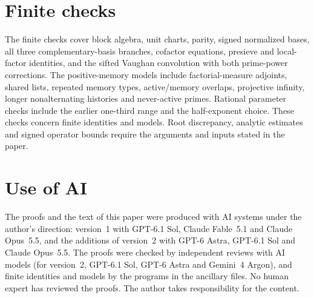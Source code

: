 \documentclass[11pt]{article}
\theoremstyle{definition}
\theoremstyle{remark}
\numberwithin{equation}{section}
\begin{document}
\normalsize

\section{Finite checks}\label{app:checks}
The finite checks cover block algebra, unit charts, parity, signed
normalized bases, all three complementary-basis branches, cofactor
equations, presieve and local-factor identities, and the sifted
Vaughan convolution with both prime-power corrections.
The positive-memory models include factorial-measure adjoints,
shared lists, repeated memory types, active/memory overlaps,
projective infinity, longer nonalternating histories and never-active
primes. Rational parameter checks include the earlier one-third
range and the half-exponent choice.
These checks concern finite identities and models. Root discrepancy,
analytic estimates and signed operator bounds require the arguments
and inputs stated in the paper.



\section*{Use of AI}
The proofs and the text of this paper were produced with AI systems
under the author's direction: version~1 with GPT-6.1 Sol, Claude
Fable~5.1 and Claude Opus~5.5, and the additions of version~2 with
GPT-6 Astra, GPT-6.1 Sol and Claude Opus~5.5. The proofs were checked
by independent reviews with AI models (for version~2, GPT-6.1 Sol,
GPT-6 Astra and Gemini~4 Argon), and finite identities and models by
the programs in the ancillary files. No human expert has reviewed the
proofs. The author takes responsibility for the content.
\end{document}
